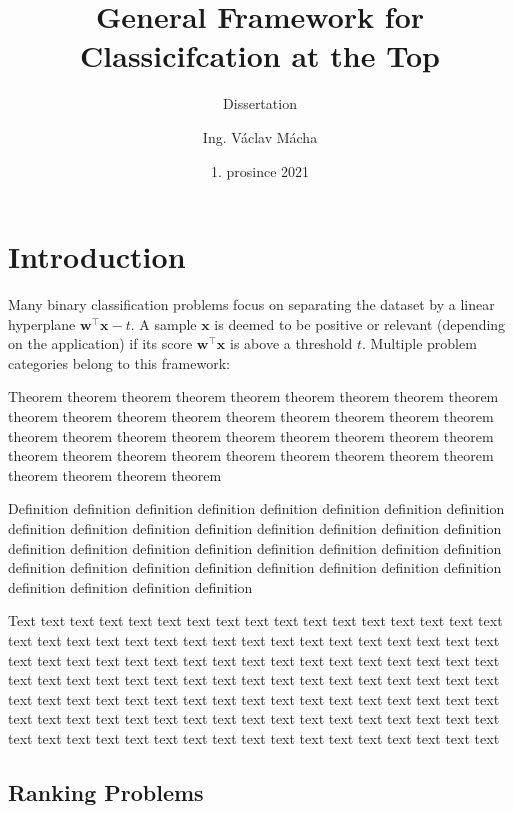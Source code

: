\documentclass{Thesis}
\title{General Framework for Classicifcation at the Top}
\subtitle{Dissertation}
\author{Ing. Václav Mácha}
\date{1. prosince 2021}
\newcommand{\wb}{\bm{w}}
\newcommand{\xb}{\bm{x}}
\begin{document}
\maketitle

\chapter{Introduction}

Many binary classification problems focus on separating the dataset by a linear hyperplane $\wb^\top \xb - t$. A sample $\xb$ is deemed to be positive or relevant (depending on the application) if its score $\wb^\top \xb$ is above a threshold $t$. Multiple problem categories belong to this framework:

\begin{theorem}
  Theorem theorem  theorem theorem theorem theorem theorem theorem theorem theorem theorem theorem theorem theorem theorem theorem theorem theorem theorem theorem theorem theorem theorem theorem theorem theorem theorem theorem theorem theorem theorem theorem theorem theorem theorem theorem theorem theorem theorem theorem
\end{theorem}

\begin{definition}
  Definition definition definition definition definition definition definition definition definition definition definition definition definition definition definition definition definition definition definition definition definition definition definition definition definition definition definition definition definition definition definition definition definition definition definition definition
\end{definition}

Text text text text text text text text text text text text text text text text text text text text text text text text text text text text text text text text text text text text text text text text text text text text text text text text text text text text text text text text text text text text text text text text text text text text text text text text text text text text text text text text text text text text text text text text text text text text text text text text text text text text text text text text text text text text text text text text text text text text text text text

\section{Ranking Problems}
\end{document}
